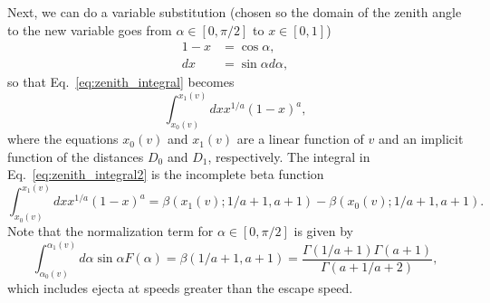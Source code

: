 \documentclass{hitec}
\begin{document}
Next, we can do a variable substitution (chosen so the domain of the zenith angle to the new variable goes from $\alpha\in [0,\pi/2]$ to $x\in [0,1]$)
\begin{align}
1-x &= \cos\alpha,\\
dx &= \sin\alpha d\alpha,
\end{align}
so that Eq.\ \eqref{eq:zenith_integral} becomes
\begin{equation}\label{eq:zenith_integral2}
\int_{x_0(v)}^{x_1(v)}dx x^{1/a}(1-x)^a,
\end{equation}
where the equations $x_0(v)$ and $x_1(v)$ are a linear function of $v$ and an implicit function of the distances $D_0$ and $D_1$, respectively. The integral in Eq.\ \eqref{eq:zenith_integral2} is the incomplete beta function
\begin{equation}\label{eq:zenith_integral3}
\int_{x_0(v)}^{x_1(v)}dx x^{1/a}(1-x)^a
= \beta(x_1(v); 1/a+1, a+1) - \beta(x_0(v); 1/a+1, a+1).
\end{equation}
Note that the normalization term for $\alpha\in [0, \pi/2]$ is given by
\begin{equation}
\int_{\alpha_0(v)}^{\alpha_1(v)}d\alpha\sin\alpha F(\alpha) = 
\beta(1/a+1, a+1) = \frac{\Gamma(1/a+1)\Gamma(a+1)}{\Gamma(a+1/a+2)},
\end{equation}
which includes ejecta at speeds greater than the escape speed.
\end{document}
